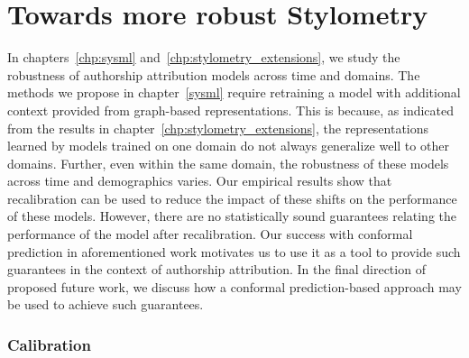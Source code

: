 \section{Towards more robust Stylometry}

In chapters~\ref{chp:sysml} and~\ref{chp:stylometry_extensions}, we study the robustness of authorship attribution models across time and domains.
The methods we propose in chapter~\ref*{sysml} require retraining a model with additional context provided from graph-based representations.
This is because, as indicated from the results in chapter~\ref*{chp:stylometry_extensions}, the representations learned by models trained on one domain do not always generalize well to other domains.
Further, even within the same domain, the robustness of these models across time and demographics varies.
Our empirical results show that recalibration can be used to reduce the impact of these shifts on the performance of these models.
However, there are no statistically sound guarantees relating the performance of the model after recalibration.
Our success with conformal prediction in aforementioned work motivates us to use it as a tool to provide such guarantees in the context of authorship attribution.
In the final direction of proposed future work, we discuss how a conformal prediction-based approach may be used to achieve such guarantees.

\subsubsection{Calibration}

